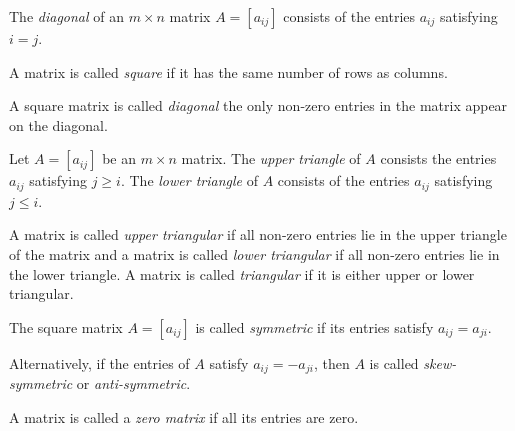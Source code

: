 \begin{SaveDefinition}[key=Diagonal, title={Diagonal}]
	The \emph{diagonal} of an $m\times n$ matrix $A=[a_{ij}]$ consists of
	the entries $a_{ij}$ satisfying $i=j$.
\end{SaveDefinition}
\begin{SaveDefinition}[key=SquareMatrix, title={Square Matrix}]
	A matrix is called \emph{square} if it has the same
	number of rows as columns.
\end{SaveDefinition}
\begin{SaveDefinition}[key=DiagonalMatrix, title={Diagonal Matrix}]
	A square matrix is called \emph{diagonal} the only non-zero
	entries in the matrix appear on the diagonal.
\end{SaveDefinition}
\begin{SaveDefinition}[key=TriangleOf, title={Upper \& Lower Triangle}]
	Let $A=[a_{ij}]$ be an $m\times n$ matrix. The \emph{upper triangle}
	of $A$ consists the entries $a_{ij}$
	satisfying $j\geq i$. The \emph{lower triangle}
	of $A$ consists of the entries $a_{ij}$ satisfying $j\leq i$.
\end{SaveDefinition}
\begin{SaveDefinition}[key=TriangularMatrix, title={Triangular Matrices}]
	A matrix is called \emph{upper triangular} if all non-zero entries lie in the upper triangle of the matrix and
	a matrix is called \emph{lower triangular} if all non-zero entries lie in the lower triangle. A matrix is
	called \emph{triangular} if it is either upper or lower triangular.
\end{SaveDefinition}
\begin{SaveDefinition}[key=SymmetricMatrix, title={Symmetric Matrix}]
	The square matrix $A=[a_{ij}]$ is called \emph{symmetric} if its
	entries satisfy $a_{ij}=a_{ji}$.

	Alternatively, if the entries of $A$ satisfy $a_{ij}=-a_{ji}$, then $A$
	is called \emph{skew-symmetric} or \emph{anti-symmetric}.
\end{SaveDefinition}
\begin{SaveDefinition}[key=ZeroMatrix, title={Zero Matrix}]
	A matrix is called a \emph{zero matrix} if all its entries are zero.
\end{SaveDefinition}

